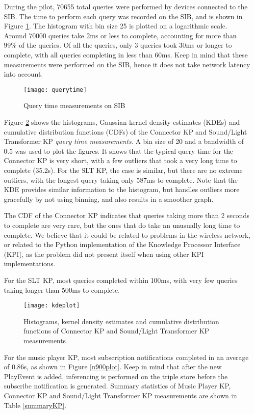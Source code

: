 During the pilot, 70655 total queries were performed by devices connected to the SIB. The time to perform each query was recorded on the SIB, and is shown in Figure \ref{querytime}. The histogram with bin size 25 is plotted on a logarithmic scale. Around 70000 queries take 2ms or less to complete, accounting for more than 99\% of the queries. Of all the queries, only 3 queries took 30ms or longer to complete, with all queries completing in less than 60ms. Keep in mind that these measurements were performed on the SIB, hence it does not take network latency into account.

\begin{figure}
\centering
\texttt{[image: querytime]}
\caption{Query time measurements on SIB}
\label{querytime}
\end{figure}

Figure \ref{kdeplot} shows the histograms, Gaussian kernel density estimates (KDEs) and cumulative distribution functions (CDFs) of the Connector KP and Sound/Light Transformer KP \emph{query time measurements}. A bin size of 20 and a bandwidth of 0.5 was used to plot the figures. It shows that the typical query time for the Connector KP is very short, with a few outliers that took a very long time to complete (35.2s). For the SLT KP, the case is similar, but there are no extreme outliers, with the longest query taking only 587ms to complete. Note that the KDE provides similar information to the histogram, but handles outliers more gracefully by not using binning, and also results in a smoother graph.

The CDF of the Connector KP indicates that queries taking more than 2 seconds to complete are very rare, but the ones that do take an unusually long time to complete. We believe that it could be related to problems in the wireless network, or related to the Python implementation of the Knowledge Processor Interface (KPI), as the problem did not present itself when using other KPI implementations.

For the SLT KP, most queries completed within 100ms, with very few queries taking longer than 500ms to complete.

\begin{figure}
\centering
\texttt{[image: kdeplot]}
\caption{Histograms, kernel density estimates and cumulative distribution functions of Connector KP and Sound/Light Transformer KP measurements}
\label{kdeplot}
\end{figure}

For the music player KP, most subscription notifications completed in an average of 0.86s, as shown in Figure \ref{n900plot}. Keep in mind that after the new PlayEvent is added, inferencing is performed on the triple store before the subscribe notification is generated. Summary statistics of Music Player KP, Connector KP and Sound/Light Transformer KP measurements are shown in Table \ref{summaryKP}.

